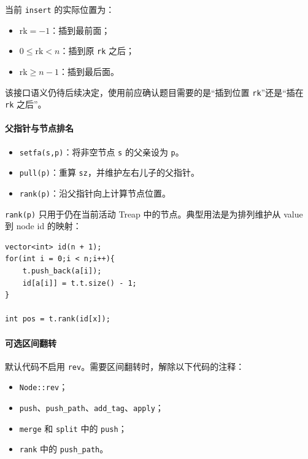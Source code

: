 当前 \texttt{insert} 的实际位置为：

\begin{itemize}
  \item $\mathrm{rk}=-1$：插到最前面；
  \item $0\le\mathrm{rk}<n$：插到原 \texttt{rk} 之后；
  \item $\mathrm{rk}\ge n-1$：插到最后面。
\end{itemize}

该接口语义仍待后续决定，使用前应确认题目需要的是“插到位置 \texttt{rk}”还是“插在 \texttt{rk} 之后”。

\paragraph*{父指针与节点排名}

\begin{itemize}
  \item \texttt{setfa(s,p)}：将非空节点 \texttt{s} 的父亲设为 \texttt{p}。
  \item \texttt{pull(p)}：重算 \texttt{sz}，并维护左右儿子的父指针。
  \item \texttt{rank(p)}：沿父指针向上计算节点位置。
\end{itemize}

\texttt{rank(p)} 只用于仍在当前活动 Treap 中的节点。典型用法是为排列维护从 value 到 node id 的映射：

\begin{verbatim}
vector<int> id(n + 1);
for(int i = 0;i < n;i++){
    t.push_back(a[i]);
    id[a[i]] = t.t.size() - 1;
}

int pos = t.rank(id[x]);
\end{verbatim}

\paragraph*{可选区间翻转}

默认代码不启用 \texttt{rev}。需要区间翻转时，解除以下代码的注释：

\begin{itemize}
  \item \texttt{Node::rev}；
  \item \texttt{push}、\texttt{push\_path}、\texttt{add\_tag}、\texttt{apply}；
  \item \texttt{merge} 和 \texttt{split} 中的 \texttt{push}；
  \item \texttt{rank} 中的 \texttt{push\_path}。
\end{itemize}

